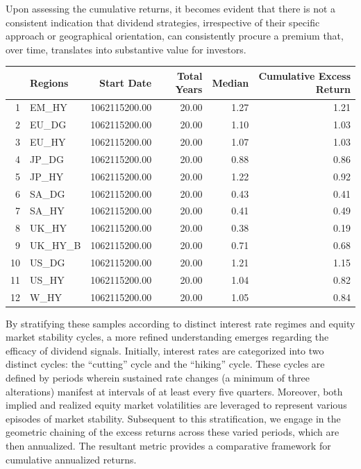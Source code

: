 \documentclass[12pt,preprint, authoryear]{elsarticle}
\let\origtable\table
\let\endorigtable\endtable
\renewenvironment{table}[1][2] {
    \expandafter\origtable\expandafter[H]
} {
    \endorigtable
}
\numberwithin{equation}{section}
\numberwithin{figure}{section}
\numberwithin{table}{section}
\begin{document}
Upon assessing the cumulative returns, it becomes evident that there is
not a consistent indication that dividend strategies, irrespective of
their specific approach or geographical orientation, can consistently
procure a premium that, over time, translates into substantive value for
investors.

\begin{table}[H]
\centering
\begin{tabular}{rlrrrr}
  \hline
 & Regions & Start Date & Total Years & Median & Cumulative Excess Return \\ 
  \hline
1 & EM\_HY & 1062115200.00 & 20.00 & 1.27 & 1.21 \\ 
  2 & EU\_DG & 1062115200.00 & 20.00 & 1.10 & 1.03 \\ 
  3 & EU\_HY & 1062115200.00 & 20.00 & 1.07 & 1.03 \\ 
  4 & JP\_DG & 1062115200.00 & 20.00 & 0.88 & 0.86 \\ 
  5 & JP\_HY & 1062115200.00 & 20.00 & 1.22 & 0.92 \\ 
  6 & SA\_DG & 1062115200.00 & 20.00 & 0.43 & 0.41 \\ 
  7 & SA\_HY & 1062115200.00 & 20.00 & 0.41 & 0.49 \\ 
  8 & UK\_HY & 1062115200.00 & 20.00 & 0.38 & 0.19 \\ 
  9 & UK\_HY\_B & 1062115200.00 & 20.00 & 0.71 & 0.68 \\ 
  10 & US\_DG & 1062115200.00 & 20.00 & 1.21 & 1.15 \\ 
  11 & US\_HY & 1062115200.00 & 20.00 & 1.04 & 0.82 \\ 
  12 & W\_HY & 1062115200.00 & 20.00 & 1.05 & 0.84 \\ 
   \hline
\end{tabular}
\caption{Cumulative Excess Return \label{tab1}} 
\end{table}

By stratifying these samples according to distinct interest rate regimes
and equity market stability cycles, a more refined understanding emerges
regarding the efficacy of dividend signals. Initially, interest rates
are categorized into two distinct cycles: the ``cutting'' cycle and the
``hiking'' cycle. These cycles are defined by periods wherein sustained
rate changes (a minimum of three alterations) manifest at intervals of
at least every five quarters. Moreover, both implied and realized equity
market volatilities are leveraged to represent various episodes of
market stability. Subsequent to this stratification, we engage in the
geometric chaining of the excess returns across these varied periods,
which are then annualized. The resultant metric provides a comparative
framework for cumulative annualized returns.
\end{document}
